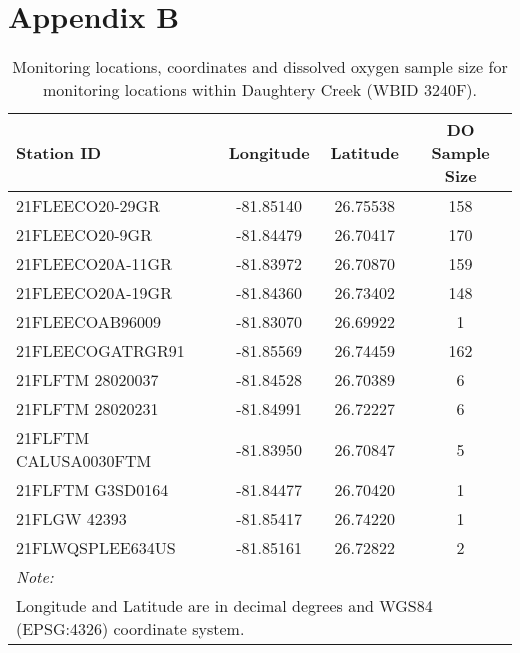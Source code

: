 \documentclass[]{interact}
\theoremstyle{plain}%
\theoremstyle{definition}
\theoremstyle{remark}
\begin{document}
\newpage

\hypertarget{appendix-b}{%
\section{Appendix B}\label{appendix-b}}

\setcounter{table}{0}  \renewcommand{\thetable}{S\arabic{table}} \setcounter{figure}{0} \renewcommand{\thefigure}{S\arabic{figure}}

\begin{table}[H]

\caption{\label{tab:tabs1}Monitoring locations, coordinates and dissolved oxygen sample size for monitoring locations within Daughtery Creek (WBID 3240F).}
\centering
\fontsize{10}{12}\selectfont
\begin{tabular}[t]{lccc}
\toprule
\textbf{Station ID} & \textbf{Longitude} & \textbf{Latitude} & \textbf{DO Sample Size}\\
\midrule
21FLEECO20-29GR & -81.85140 & 26.75538 & 158\\
21FLEECO20-9GR & -81.84479 & 26.70417 & 170\\
21FLEECO20A-11GR & -81.83972 & 26.70870 & 159\\
21FLEECO20A-19GR & -81.84360 & 26.73402 & 148\\
21FLEECOAB96009 & -81.83070 & 26.69922 & 1\\
\addlinespace
21FLEECOGATRGR91 & -81.85569 & 26.74459 & 162\\
21FLFTM 28020037 & -81.84528 & 26.70389 & 6\\
21FLFTM 28020231 & -81.84991 & 26.72227 & 6\\
21FLFTM CALUSA0030FTM & -81.83950 & 26.70847 & 5\\
21FLFTM G3SD0164 & -81.84477 & 26.70420 & 1\\
\addlinespace
21FLGW  42393 & -81.85417 & 26.74220 & 1\\
21FLWQSPLEE634US & -81.85161 & 26.72822 & 2\\
\bottomrule
\multicolumn{4}{l}{\rule{0pt}{1em}\textit{Note: }}\\
\multicolumn{4}{l}{\rule{0pt}{1em}Longitude and Latitude are in decimal degrees and WGS84 (EPSG:4326) coordinate system.}\\
\end{tabular}
\end{table}
\end{document}
